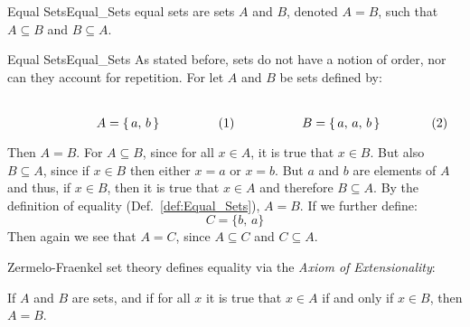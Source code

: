         \begin{ldefinition}{Equal Sets}{Equal_Sets}
            \Glspl{equal set} are sets $A$ and $B$, denoted $A=B$, such that
            $A\subseteq{B}$ and $B\subseteq{A}$.
        \end{ldefinition}
        \begin{lexample}{Equal Sets}{Equal_Sets}
            As stated before, sets do not have a notion of order, nor can they
            account for repetition. For let $A$ and $B$ be sets defined by:
            \par
            \begin{subequations}
                \begin{minipage}[b]{0.49\textwidth}
                    \centering
                    \begin{equation}
                        A=\{\,a,\,b\,\}
                    \end{equation}
                \end{minipage}
                \hfill
                \begin{minipage}[b]{0.49\textwidth}
                    \centering
                    \begin{equation}
                        B=\{\,a,\,a,\,b\,\}
                    \end{equation}
                \end{minipage}
            \end{subequations}
            \par\vspace{2.5ex}
            Then $A=B$. For $A\subseteq{B}$, since for all $x\in{A}$, it is
            true that $x\in{B}$. But also $B\subseteq{A}$, since if
            $x\in{B}$ then either $x=a$ or $x=b$. But $a$ and $b$ are elements
            of $A$ and thus, if $x\in{B}$, then it is true that $x\in{A}$
            and therefore $B\subseteq{A}$. By the definition of equality
            (Def.~\ref{def:Equal_Sets}), $A=B$. If we further define:
            \begin{equation}
                C=\{b,\,a\}
            \end{equation}
            Then again we see that $A=C$, since $A\subseteq{C}$ and
            $C\subseteq{A}$.
        \end{lexample}
        Zermelo-Fraenkel set theory defines equality via
        the \textit{Axiom of Extensionality}:
        \begin{axiom}
            If $A$ and $B$ are sets, and if for all $x$ it is true that
            $x\in{A}$ if and only if $x\in{B}$, then $A=B$.
        \end{axiom}
